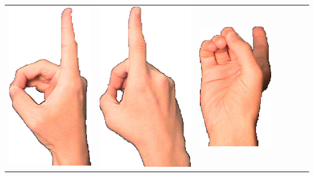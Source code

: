 \documentclass{article}
\begin{document}
\begin{center}
\begin{tabular}{r*{6}{c}}
\includegraphics[scale=0.1]{images/01-02-2.jpg}&
\includegraphics[scale=0.1]{images/01-02-3.jpg}&
\includegraphics[scale=0.1]{images/01-02-4.jpg}&

\end{tabular}
\end{center}
\end{document}
